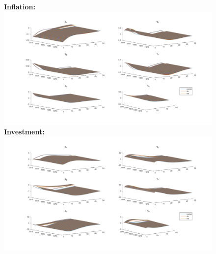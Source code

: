 \documentclass[12pt,reqno]{article}
\numberwithin{equation}{section}
\begin{document}
\begin{figure}[H]
\textbf{Inflation:}\\
\includegraphics[scale=0.5]{MSV_impresp_pinf_3d.pdf}
\textbf{Investment:}\\
\includegraphics[scale=0.5]{MSV_impresp_inve_3d.pdf}
\end{figure}
\end{document}
